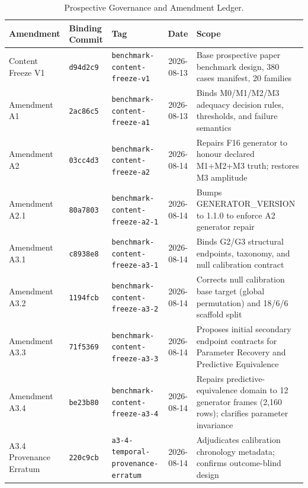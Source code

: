 \begin{table}[t]
\centering
\small
\caption{Prospective Governance and Amendment Ledger.}
\label{tab:governance_amendments}
\begin{tabular}{lllcl}
\toprule
Amendment & Binding Commit & Tag & Date & Scope \\
\midrule
Content Freeze V1 & \texttt{d94d2c9} & \texttt{benchmark-content-freeze-v1} & 2026-08-13 & Base prospective paper benchmark design, 380 cases manifest, 20 families \\
Amendment A1 & \texttt{2ac86c5} & \texttt{benchmark-content-freeze-a1} & 2026-08-13 & Binds M0/M1/M2/M3 adequacy decision rules, thresholds, and failure semantics \\
Amendment A2 & \texttt{03cc4d3} & \texttt{benchmark-content-freeze-a2} & 2026-08-14 & Repairs F16 generator to honour declared M1+M2+M3 truth; restores M3 amplitude \\
Amendment A2.1 & \texttt{80a7803} & \texttt{benchmark-content-freeze-a2-1} & 2026-08-14 & Bumps GENERATOR_VERSION to 1.1.0 to enforce A2 generator repair \\
Amendment A3.1 & \texttt{c8938e8} & \texttt{benchmark-content-freeze-a3-1} & 2026-08-14 & Binds G2/G3 structural endpoints, taxonomy, and null calibration contract \\
Amendment A3.2 & \texttt{1194fcb} & \texttt{benchmark-content-freeze-a3-2} & 2026-08-14 & Corrects null calibration base target (global permutation) and 18/6/6 scaffold split \\
Amendment A3.3 & \texttt{71f5369} & \texttt{benchmark-content-freeze-a3-3} & 2026-08-14 & Proposes initial secondary endpoint contracts for Parameter Recovery and Predictive Equivalence \\
Amendment A3.4 & \texttt{be23b80} & \texttt{benchmark-content-freeze-a3-4} & 2026-08-14 & Repairs predictive-equivalence domain to 12 generator frames (2,160 rows); clarifies parameter invariance \\
A3.4 Provenance Erratum & \texttt{220c9cb} & \texttt{a3-4-temporal-provenance-erratum} & 2026-08-14 & Adjudicates calibration chronology metadata; confirms outcome-blind design \\
\bottomrule
\end{tabular}
\end{table}
